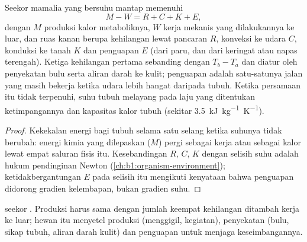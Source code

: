 \begin{proposition}\label{prop:b1:mammal-organization:heatbudget}
Seekor mamalia yang bersuhu mantap memenuhi
\[
M - W = R + C + K + E ,
\]
dengan $M$ produksi kalor metaboliknya, $W$ kerja mekanis yang
dilakukannya ke luar, dan ruas kanan berupa kehilangan lewat pancaran
$R$, konveksi ke udara $C$, konduksi ke tanah $K$ dan penguapan $E$
(dari paru, dan dari keringat atau napas terengah). Ketiga kehilangan
pertama sebanding dengan $T_b - T_a$ dan diatur oleh penyekatan bulu
serta aliran darah ke kulit; penguapan adalah satu-satunya jalan yang
masih bekerja ketika udara lebih hangat daripada tubuh. Ketika
persamaan itu tidak terpenuhi, suhu tubuh melayang pada laju yang
ditentukan ketimpangannya dan kapasitas kalor tubuh (sekitar
\qty{3.5}{kJ.kg^{-1}.K^{-1}}).
\end{proposition}
\begin{proof}
Kekekalan energi bagi tubuh selama satu selang ketika suhunya tidak
berubah: energi kimia yang dilepaskan ($M$) pergi sebagai kerja atau
sebagai kalor lewat empat saluran fisis itu. Kesebandingan $R$, $C$, $K$
dengan selisih suhu adalah hukum pendinginan Newton
(\cref{ch:b1:organism-environment}); ketidakbergantungan $E$ pada
selisih itu mengikuti kenyataan bahwa penguapan didorong gradien
kelembapan, bukan gradien suhu.
\end{proof}

\begin{omfigure}

{\small {} seekor . Produksi harus sama dengan jumlah
keempat kehilangan ditambah kerja ke luar; hewan itu menyetel produksi
(menggigil, kegiatan), penyekatan (bulu, sikap tubuh, aliran darah
kulit) dan penguapan untuk menjaga keseimbangannya.}
\end{omfigure}

